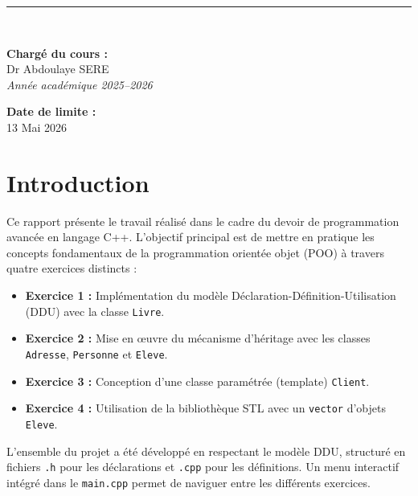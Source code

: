 \documentclass[12pt,a4paper]{article}
\begin{document}
\begin{titlepage}
    \vfill

    \rule{\linewidth}{0.8pt}\\[0.3cm]
    \noindent
    \begin{minipage}[t]{0.5\textwidth}
        \textbf{Charg\'e du cours :}\\[0.2cm]
        Dr Abdoulaye SERE\\
        \textit{Ann\'ee acad\'emique 2025--2026}
    \end{minipage}
    \hfill
    \begin{minipage}[t]{0.4\textwidth}
        \raggedleft
        \textbf{Date de limite :}\\[0.2cm]
        13 Mai 2026
    \end{minipage}

\end{titlepage}

\clearpage

\tableofcontents
\newpage

\section{Introduction}

Ce rapport présente le travail réalisé dans le cadre du devoir de programmation avancée en langage C++. L'objectif principal est de mettre en pratique les concepts fondamentaux de la programmation orientée objet (POO) à travers quatre exercices distincts :

\begin{itemize}[leftmargin=1.5cm]
    \item \textbf{Exercice 1 :} Implémentation du modèle Déclaration-Définition-Utilisation (DDU) avec la classe \texttt{Livre}.
    \item \textbf{Exercice 2 :} Mise en œuvre du mécanisme d'héritage avec les classes \texttt{Adresse}, \texttt{Personne} et \texttt{Eleve}.
    \item \textbf{Exercice 3 :} Conception d'une classe paramétrée (template) \texttt{Client}.
    \item \textbf{Exercice 4 :} Utilisation de la bibliothèque STL avec un \texttt{vector} d'objets \texttt{Eleve}.
\end{itemize}

L'ensemble du projet a été développé en respectant le modèle DDU, structuré en fichiers \texttt{.h} pour les déclarations et \texttt{.cpp} pour les définitions. Un menu interactif intégré dans le \texttt{main.cpp} permet de naviguer entre les différents exercices.
\end{document}
